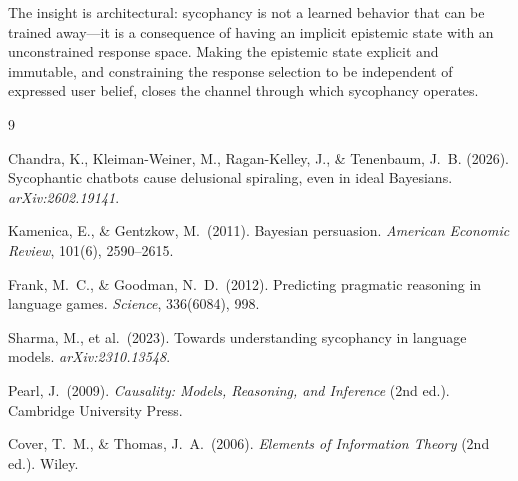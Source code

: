 \documentclass[12pt]{article}
\theoremstyle{definition}
\begin{document}
The insight is architectural: sycophancy is not a learned behavior
that can be trained away---it is a consequence of having an implicit
epistemic state with an unconstrained response space. Making the
epistemic state explicit and immutable, and constraining the response
selection to be independent of expressed user belief, closes the
channel through which sycophancy operates.


\begin{thebibliography}{9}

Chandra, K., Kleiman-Weiner, M., Ragan-Kelley, J., \& Tenenbaum, J.\ B.
(2026).
Sycophantic chatbots cause delusional spiraling, even in ideal Bayesians.
\textit{arXiv:2602.19141}.

Kamenica, E., \& Gentzkow, M.\ (2011).
Bayesian persuasion.
\textit{American Economic Review}, 101(6), 2590--2615.

Frank, M.\ C., \& Goodman, N.\ D.\ (2012).
Predicting pragmatic reasoning in language games.
\textit{Science}, 336(6084), 998.

Sharma, M., et al.\ (2023).
Towards understanding sycophancy in language models.
\textit{arXiv:2310.13548}.

Pearl, J.\ (2009).
\textit{Causality: Models, Reasoning, and Inference} (2nd ed.).
Cambridge University Press.

Cover, T.\ M., \& Thomas, J.\ A.\ (2006).
\textit{Elements of Information Theory} (2nd ed.).
Wiley.

\end{thebibliography}
\end{document}
